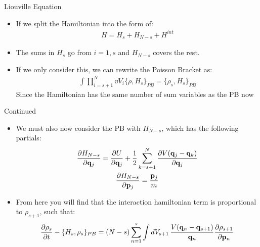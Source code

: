 \documentclass{beamer}
\begin{document}
\begin{frame}{Liouville Equation}
  \begin{itemize}
  \item If we split the Hamiltonian into the form of:
    \begin{align*}
      H=H_s+H_{N-s}+H^{int}
    \end{align*}
  \item The sums in $H_s$ go from $i=1,s$ and $H_{N-s}$ covers the rest. 
  \item If we only consider this, we can rewrite the Poisson Bracket as:
    \begin{align*}
      \int\prod_{i=s+1}^N\dd{V}_i\{\rho,H_s\}_{PB}=\{\rho_s,H_s\}_{PB}
    \end{align*}
    Since the Hamiltonian has the same number of sum variables as the PB now
  \end{itemize}
\end{frame}
\begin{frame}{Continued}
  \begin{itemize}
  \item We must also now consider the PB with $H_{N-s}$, which has the following partials:
    \begin{gather*}
      \pdv{H_{N-s}}{\vb{q}_j}=\pdv{U}{\vb{q}_j}+
      \frac12\sum_{k=s+1}^N\pdv{V(\vb{q}_j-\vb{q}_k)}{\vb{q}_j}\\
      \pdv{H_{N-s}}{\vb{p}_j}=\frac{\vb{p}_j}{m}
    \end{gather*}
  \item From here you will find that the interaction hamiltonian term is proportional to $\rho_{s+1}$, such that:
    \begin{align*}
      \pdv{\rho_s}{t}-\{H_s,\rho_s\}_{PB}=(N-s)\sum_{n=1}^s\int\dd{V_{s+1}}
      \frac{V(\vb{q}_n-\vb{q}_{s+1})}{\vb{q}_n}\pdv{\rho_{s+1}}{\vb{p}_n}
    \end{align*}
  \end{itemize}
\end{frame}
\end{document}
